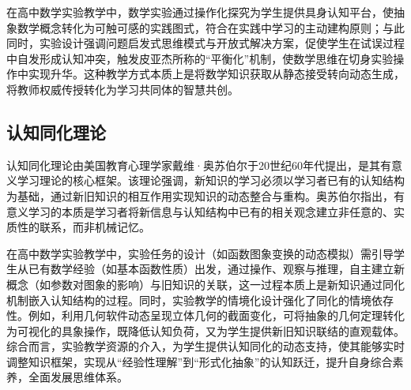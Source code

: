 在高中数学实验教学中，数学实验通过操作化探究为学生提供具身认知平台，使抽象数学概念转化为可触可感的实践图式，符合在实践中学习的主动建构原则；与此同时，实验设计强调问题启发式思维模式与开放式解决方案，促使学生在试误过程中自发形成认知冲突，触发皮亚杰所称的“平衡化”机制，使数学思维在切身实验操作中实现升华。这种教学方式本质上是将数学知识获取从静态接受转向动态生成，将教师权威传授转化为学习共同体的智慧共创。

\subsection{认知同化理论}
认知同化理论由美国教育心理学家戴维·奥苏伯尔于20世纪60年代提出，是其有意义学习理论的核心框架。该理论强调，新知识的学习必须以学习者已有的认知结构为基础，通过新旧知识的相互作用实现知识的动态整合与重构。奥苏伯尔指出，有意义学习的本质是学习者将新信息与认知结构中已有的相关观念建立非任意的、实质性的联系，而非机械记忆\cite{2022_施佳莹_奥苏伯尔认知同化理论对中学数学教学的启示}。

在高中数学实验教学中，实验任务的设计（如函数图象变换的动态模拟）需引导学生从已有数学经验（如基本函数性质）出发，通过操作、观察与推理，自主建立新概念（如参数对图象的影响）与旧知识的关联，这一过程本质上是新知识通过同化机制嵌入认知结构的过程。同时，实验教学的情境化设计强化了同化的情境依存性。例如，利用几何软件动态呈现立体几何的截面变化，可将抽象的几何定理转化为可视化的具象操作，既降低认知负荷，又为学生提供新旧知识联结的直观载体。综合而言，实验教学资源的介入，为学生提供认知同化的动态支持，使其能够实时调整知识框架，实现从“经验性理解”到“形式化抽象”的认知跃迁，提升自身综合素养，全面发展思维体系。